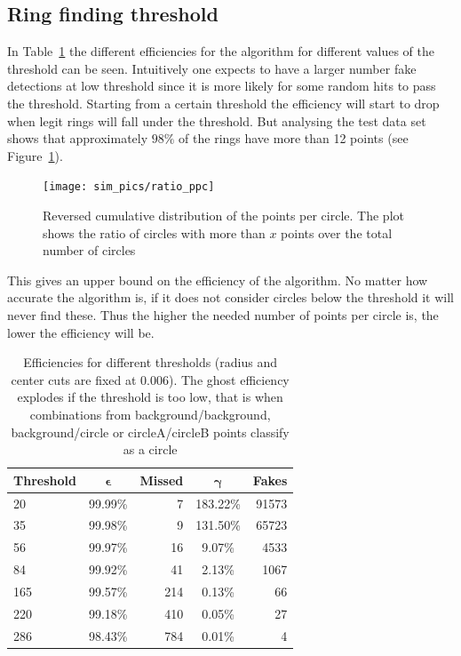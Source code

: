 \documentclass[11pt]{scrreprt}
\begin{document}
\subsection{Ring finding threshold} %
\label{sub:different_thresholds2}

In Table~\ref{tab:threshold_cuts} the different efficiencies for the algorithm for different values of the threshold can be seen. 
Intuitively one expects to have a larger number fake detections at low threshold since it is more likely for some random hits to pass 
the threshold. Starting from a certain threshold the efficiency will start to drop when legit rings will fall under the threshold. But
analysing the test data set shows that approximately $98\%$ of the rings have more than 12 points (see Figure~\ref{fig:ratio_ppc}).

\begin{figure}[tb]
  \centering
  \texttt{[image: sim\_pics/ratio\_ppc]}
  \caption{Reversed cumulative distribution of the points per circle. The plot shows the ratio of circles with more than $x$ points over the
  total number of circles}
  \label{fig:ratio_ppc}
\end{figure}

This gives an upper bound on the efficiency of the algorithm. No matter 
how accurate the algorithm is, if it does not consider circles below the threshold it will never find these. Thus the higher 
the needed number of points per circle is, the lower the efficiency will be. 


\begin{table}[tb]
  \caption[Efficiencies for different thresholds]{Efficiencies for different thresholds (radius and center cuts are fixed at $0.006$). The ghost efficiency explodes if the threshold is too low, that is when combinations
  from background/background, background/circle or circleA/circleB points classify as a circle}
  \label{tab:threshold_cuts}
  \centering

  \begin{tabular}{lcrcr}
  \toprule
  \textbf{Threshold} & $\boldsymbol{\epsilon}$ & \textbf{Missed} & $\boldsymbol{\gamma}$ & \textbf{Fakes} \\
  \midrule
  20  & 99.99\% & 7 & 183.22\% & 91573 \\
  35  & 99.98\% & 9 & 131.50\% & 65723 \\
  56  & 99.97\% & 16 & 9.07\% & 4533 \\
  84  & 99.92\% & 41 & 2.13\% & 1067 \\
  165 & 99.57\% & 214 & 0.13\% & 66 \\
  220 & 99.18\% & 410 & 0.05\% & 27 \\
  286 & 98.43\% & 784 & 0.01\% & 4 \\
  \bottomrule
  \end{tabular}
\end{table}
\end{document}
